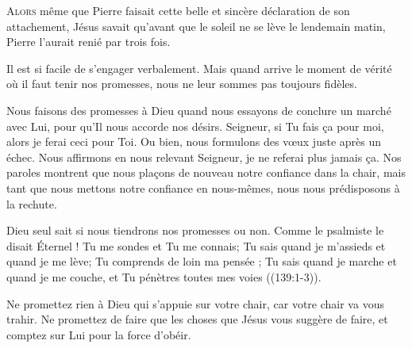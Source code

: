 



\lettrine{A}{lors} même que Pierre faisait cette belle
 et sincère déclaration de son attachement,
 Jésus savait qu'avant que le soleil ne se lève le lendemain matin,
 Pierre l'aurait renié par trois fois.

Il est si facile de s'engager verbalement.
 Mais quand arrive le moment de vérité où il faut tenir nos promesses,
 nous ne leur sommes pas toujours fidèles.


Nous faisons des promesses à Dieu quand nous essayons de conclure
 un marché avec Lui, pour qu'Il nous accorde nos désirs.
 \Og Seigneur, si Tu fais \c{c}a pour moi, alors je ferai  ceci pour Toi. \Fg{}
 Ou bien,  nous formulons des v\oe{}ux juste après un échec.
 Nous affirmons en nous relevant\frcolon{} 
 \Og Seigneur, je ne referai plus jamais \c{c}a. \Fg{}
 Nos paroles montrent que nous pla\c{c}ons de nouveau notre confiance
 dans la chair, mais tant que nous mettons notre confiance en nous-mêmes,
 nous nous prédisposons à la rechute.

Dieu seul sait si nous tiendrons nos promesses ou non.
 Comme le psalmiste le disait\frcolon{} 
 \Og Éternel ! Tu me sondes et Tu me connais; Tu sais quand je m'assieds
 et quand je me lève; Tu comprends de loin ma pensée ;
 Tu sais quand je marche et quand je me couche,
 et Tu pénètres toutes mes voies \Fg{} ((139:1-3)).

Ne promettez rien à Dieu qui s'appuie sur votre chair,
 car votre chair va vous trahir.
 Ne promettez de faire que les choses que Jésus vous suggère de faire,
 et comptez sur Lui pour la force d'obéir.

\dvrule





